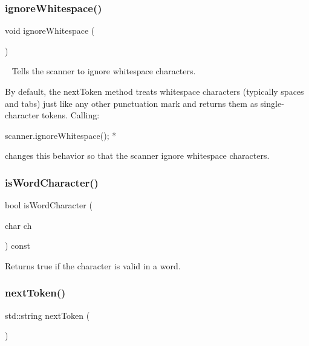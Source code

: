 \subsubsection{\texorpdfstring{ignore\+Whitespace()}{ignoreWhitespace()}}
{\footnotesize\ttfamily void ignore\+Whitespace (\begin{DoxyParamCaption}{ }\end{DoxyParamCaption})}



~\newline
 Tells the scanner to ignore whitespace characters. 

By default, the {\ttfamily next\+Token} method treats whitespace characters (typically spaces and tabs) just like any other punctuation mark and returns them as single-\/character tokens. Calling\+:


\begin{DoxyPre}
     scanner.ignoreWhitespace();
*\end{DoxyPre}


changes this behavior so that the scanner ignore whitespace characters. \mbox{\label{classTokenScanner_ad3446183cc2011a6bb3ebe1ce1c3391a}} 
\subsubsection{\texorpdfstring{is\+Word\+Character()}{isWordCharacter()}}
{\footnotesize\ttfamily bool is\+Word\+Character (\begin{DoxyParamCaption}\item[{char}]{ch }\end{DoxyParamCaption}) const}



Returns {\ttfamily true} if the character is valid in a word. 

\mbox{\label{classTokenScanner_ad515fb115cc77b70c2a498049ba16256}} 
\subsubsection{\texorpdfstring{next\+Token()}{nextToken()}}
{\footnotesize\ttfamily std\+::string next\+Token (\begin{DoxyParamCaption}{ }\end{DoxyParamCaption})}



